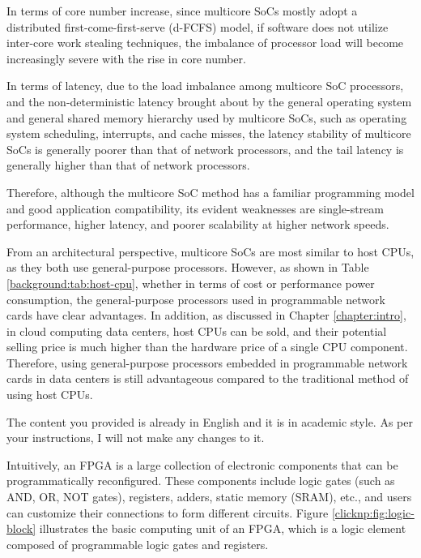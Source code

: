 In terms of core number increase, since multicore SoCs mostly adopt a distributed first-come-first-serve (d-FCFS) model, if software does not utilize inter-core work stealing techniques, the imbalance of processor load will become increasingly severe with the rise in core number.

In terms of latency, due to the load imbalance among multicore SoC processors, and the non-deterministic latency brought about by the general operating system and general shared memory hierarchy used by multicore SoCs, such as operating system scheduling, interrupts, and cache misses, the latency stability of multicore SoCs is generally poorer than that of network processors, and the tail latency is generally higher than that of network processors.

Therefore, although the multicore SoC method has a familiar programming model and good application compatibility, its evident weaknesses are single-stream performance, higher latency, and poorer scalability at higher network speeds.

From an architectural perspective, multicore SoCs are most similar to host CPUs, as they both use general-purpose processors. However, as shown in Table \ref{background:tab:host-cpu}, whether in terms of cost or performance power consumption, the general-purpose processors used in programmable network cards have clear advantages. In addition, as discussed in Chapter \ref{chapter:intro}, in cloud computing data centers, host CPUs can be sold, and their potential selling price is much higher than the hardware price of a single CPU component. Therefore, using general-purpose processors embedded in programmable network cards in data centers is still advantageous compared to the traditional method of using host CPUs.

The content you provided is already in English and it is in academic style. As per your instructions, I will not make any changes to it.

Intuitively, an FPGA is a large collection of electronic components that can be programmatically reconfigured. These components include logic gates (such as AND, OR, NOT gates), registers, adders, static memory (SRAM), etc., and users can customize their connections to form different circuits. Figure \ref{clicknp:fig:logic-block} illustrates the basic computing unit of an FPGA, which is a logic element composed of programmable logic gates and registers.

